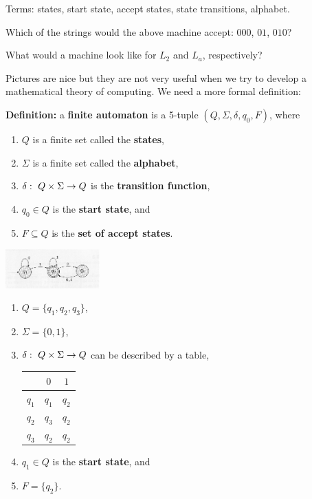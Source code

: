 \documentclass[a4paper,blends,pdf,colorBG,slideColor]{prosper}
\begin{document}
\vspace{.2in}
Terms: states, start state, accept states, state transitions, alphabet.

Which of the strings would the above machine accept: $000$, $01$, $010$?

What would a machine look like for $L_2$ and $L_a$, respectively?
\es

Pictures are nice but they are not very useful when we try to develop a mathematical
theory of computing.  We need a more formal definition:
\vspace{.5in}

{\bf Definition:} a {\bf finite automaton} is a 5-tuple $(Q, \Sigma, \delta, q_0, F)$, where
\begin{enumerate}
\item $Q$ is a finite set called the {\bf states},
\item $\Sigma$ is a finite set called the {\bf alphabet},
\item $\delta\,\colon\; Q \times \Sigma \rightarrow Q$ is the {\bf transition function},
\item $q_0 \in Q$ is the {\bf start state}, and
\item $F \subseteq Q$ is the {\bf set of accept states}.
\end{enumerate}

\es

\begin{center}
    \includegraphics[height=15mm]{images/FA-01.eps}
\end{center}
{\small
\begin{enumerate}
\item $Q =\{q_1, q_2, q_3\}$,
\item $\Sigma = \{0,1\}$,
\item $\delta\,\colon\; Q \times \Sigma \rightarrow Q$ can be described by a table,

\begin{tabular}{c | c c}
& $0$ & $1$\\ \hline
$q_1$ & $q_1$ & $q_2$\\
$q_2$ & $q_3$ & $q_2$\\
$q_3$ & $q_2$ & $q_2$
\end{tabular}

\item $q_1 \in Q$ is the {\bf start state}, and
\item $F = \{q_2\}$.
\end{enumerate}
}
\es
\end{document}
